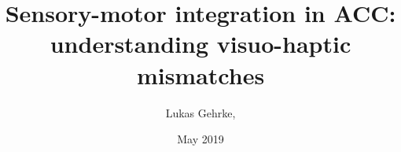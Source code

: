 \documentclass{article}
\title{Sensory-motor integration in ACC: understanding visuo-haptic mismatches}
\author{Lukas Gehrke,}
\date{May 2019}
\begin{document}
\maketitle
\linenumbers










\end{document}
